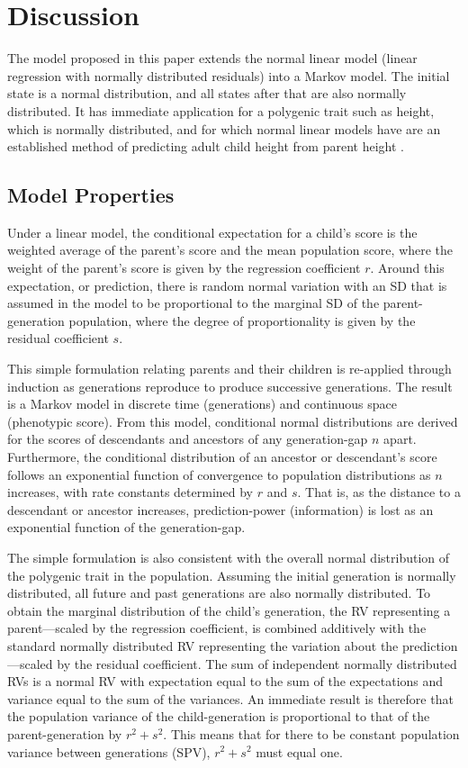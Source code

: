 \documentclass{svproc} %
\begin{document}
\section{Discussion}

The model proposed in this paper extends the normal linear model (linear regression with normally distributed residuals) into a Markov model. The initial state is a normal distribution, and all states after that are also normally distributed. It has immediate application for a polygenic trait such as height, which is normally distributed, and for which normal linear models have are an established method of predicting adult child height from parent height \cite{luo}.

\subsection{Model Properties}

Under a linear model, the conditional expectation for a child's score is the weighted average of the parent's score and the mean population score, where the weight of the parent's score is given by the regression coefficient $r$. Around this expectation, or prediction, there is random normal variation with an SD that is assumed in the model to be proportional to the marginal SD of the parent-generation population, where the degree of proportionality is given by the residual coefficient $s$. 

This simple formulation relating parents and their children is re-applied through induction as generations reproduce to produce successive generations. The result is a Markov model in discrete time (generations) and continuous space (phenotypic score). From this model, conditional normal distributions are derived for the scores of descendants and ancestors of any generation-gap $n$ apart. Furthermore, the conditional distribution of an ancestor or descendant's score follows an exponential function of convergence to population distributions as $n$ increases, with rate constants determined by $r$ and $s$. That is, as the distance to a descendant or ancestor increases, prediction-power (information) is lost as an exponential function of the generation-gap. 

The simple formulation is also consistent with the overall normal distribution of the polygenic trait in the population. Assuming the initial generation is normally distributed, all future and past generations are also normally distributed. To obtain the marginal distribution of the child's generation, the RV representing a parent---scaled by the regression coefficient, is combined additively with the standard normally distributed RV representing the variation about the prediction---scaled by the residual coefficient. The sum of independent normally distributed RVs is a normal RV with expectation equal to the sum of the expectations and variance equal to the sum of the variances. An immediate result is therefore that the population variance of the child-generation is proportional to that of the parent-generation by $r^2 + s^2$. This means that for there to be constant population variance between generations (SPV), $r^2 + s^2$ must equal one. 
\end{document}
